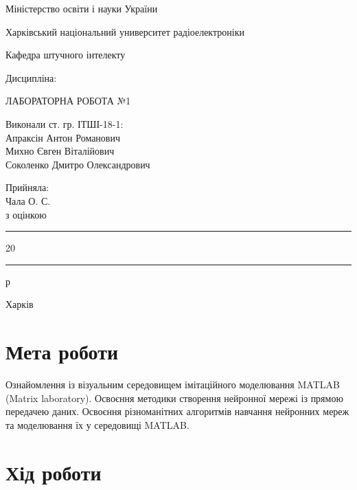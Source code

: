 \documentclass[a4paper,14pt]{extarticle}
\begin{document}
\begin{titlepage}
	\centering
    Міністерство освіти і науки України
    
    Харківський національний университет радіоелектроніки

    \vspace{1cm}
    Кафедра штучного інтелекту

    \vspace{2cm}
    Дисципліна: 

    \vspace{2cm}
    \uppercase{лабораторна робота №1}

    
    \uppercase{}

    \vspace{4cm}
    \begin{minipage}[t]{10cm}
        Виконали ст. гр. ІТШІ-18-1:\\
        Апраксін Антон Романович\\
        Михно Євген Віталійович\\
        Соколенко Дмитро Олександрович
    \end{minipage}
    \hfill
    \begin{minipage}[t]{6cm}
        Прийняла:\\
        Чала О. С.\\
        з оцінкою \say{\rule{2cm}{0.15mm}}\\
        \say{\rule{0.7cm}{0.15mm}}\rule{2cm}{0.15mm}20\rule{0.7cm}{0.15mm}р
    \end{minipage}

	\vfill

	{Харків \the\year{}}
\end{titlepage}

\section*{Мета роботи}
Ознайомлення із візуальним середовищем імітаційного моделювання MATLAB
(Matrix laboratory). Освоєння методики створення нейронної мережі із прямою передачею даних. Освоєння різноманітних алгоритмів навчання нейронних мереж та
моделювання їх у середовищі MATLAB.

\section{Хід роботи}
\end{document}
